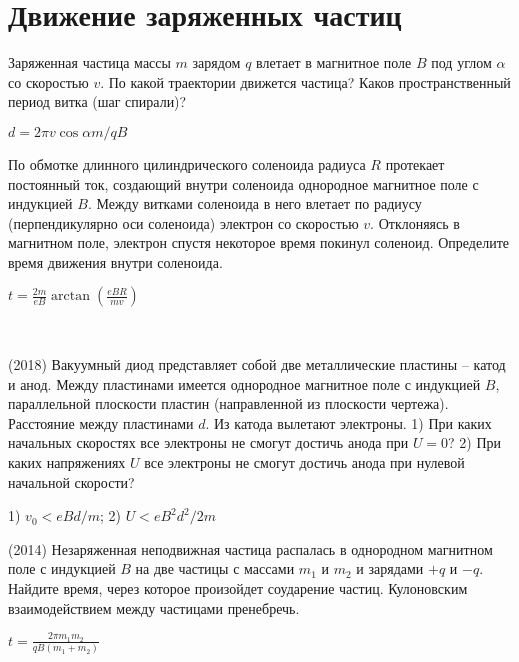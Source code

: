 \section{Движение заряженных частиц}

\begin{ex}
Заряженная частица массы $m$ зарядом $q$ влетает в магнитное поле $B$ под углом $\alpha$ со скоростью $v$. По какой траектории движется частица? Каков пространственный период витка (шаг спирали)?
\begin{ans}
$d = 2 \pi v \cos \alpha m / qB$
\end{ans}
\end{ex}

\begin{ex}
По обмотке длинного цилиндрического соленоида радиуса $R$ протекает постоянный ток, создающий внутри соленоида однородное магнитное поле с индукцией $B$. Между витками соленоида в него влетает по радиусу (перпендикулярно оси соленоида) электрон со скоростью $v$. Отклоняясь в магнитном поле, электрон спустя некоторое время покинул соленоид. Определите время движения внутри соленоида.
\begin{ans}
$t=\frac{2m}{eB}\arctan \left( \frac{eBR}{mv}\right)$
\end{ans}
\end{ex}

\begin{ex}
\hspace{0pt} \\
\begin{minipage}{.65\textwidth}
(2018) Вакуумный диод представляет собой две металлические пластины -- катод и анод. Между пластинами имеется однородное магнитное поле с индукцией $B$, параллельной плоскости пластин (направленной из плоскости чертежа). Расстояние между пластинами $d$. Из катода вылетают электроны. 1) При каких начальных скоростях все электроны не смогут достичь анода при $U = 0$? 2) При каких напряжениях $U$ все электроны не смогут достичь анода при нулевой начальной скорости?
\end{minipage}
\begin{minipage}{.35\textwidth}
\centering

\end{minipage}
\begin{ans}
1) $v_0 < eBd/m$; 2) $U < eB^2d^2/2m$
\end{ans}
\end{ex}

\begin{ex}
(2014) Незаряженная неподвижная частица распалась в однородном магнитном поле с индукцией $B$ на две частицы с массами $m_1$ и $m_2$ и зарядами $+q$ и $-q$. Найдите время, через которое произойдет соударение частиц. Кулоновским взаимодействием между частицами пренебречь.
\begin{ans}
$t = \frac{2\pi m_1 m_2}{qB(m_1+m_2)}$
\end{ans}
\end{ex}

